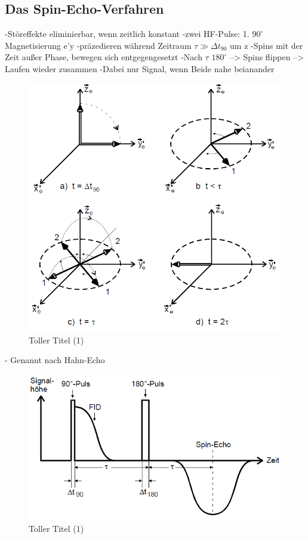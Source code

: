 \documentclass[]{scrartcl}
\begin{document}
\subsection{Das Spin-Echo-Verfahren}
-Störeffekte eliminierbar, wenn zeitlich konstant
-zwei HF-Pulse: 1. $90^\circ$ Magnetisierung e'y 
-präzedieren während Zeitraum $\tau \gg \Delta t_{90}$ um z
-Spins mit der Zeit außer Phase, bewegen sich entgegengesetzt
-Nach $\tau$  $180^\circ$ --> Spins flippen --> Laufen wieder zusammen
-Dabei nur Signal, wenn Beide nahe beianander
\begin{figure}[H]
\centering
\includegraphics[width=12cm]{images/spin_echo.png}
\caption{Toller Titel (1)}
\label{fig::spin_echo}
\end{figure}
- Genannt nach Hahn-Echo
\begin{figure}[H]
\centering
\includegraphics[width=12cm]{images/hahn_echo.png}
\caption{Toller Titel (1)}
\label{fig::hahn_echo_verlauf}
\end{figure}
\end{document}
